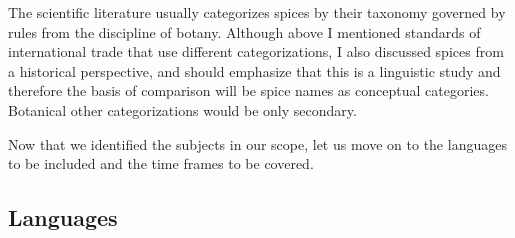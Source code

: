 The scientific literature usually categorizes spices by their taxonomy governed by rules from the discipline of botany. Although above I mentioned standards of international trade that use different categorizations, I also discussed spices from a historical perspective, and should emphasize that this is a linguistic study and therefore the basis of comparison will be spice names as conceptual categories. Botanical other categorizations would be only secondary.


Now that we identified the subjects in our scope, let us move on to the languages to be included and the time frames to be covered.

\subsection{Languages}

